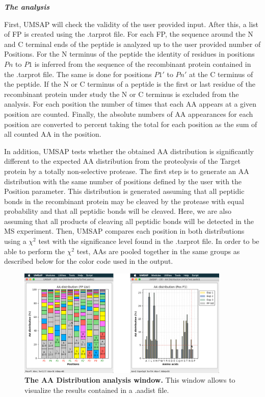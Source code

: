 \textit{\textbf{The analysis}}

First, UMSAP will check the validity of the user provided input. After this, a list of FP is created using the .tarprot file. For each FP, the sequence around the N and C terminal ends of the peptide is analyzed up to the user provided number of Positions. For the N terminus of the peptide the identity of residues in positions \(Pn\) to \(P1\) is inferred from the sequence of the recombinant protein contained in the .tarprot file. The same is done for positions \(P1'\) to \(Pn'\) at the C terminus of the peptide. If the N or C terminus of a peptide is the first or last residue of the recombinant protein under study the N or C terminus is excluded from the analysis. For each position the number of times that each AA appears at a given position are counted. Finally, the absolute numbers of AA appearances for each position are converted to percent taking the total for each position as the sum of all counted AA in the position.

In addition, UMSAP tests whether the obtained AA distribution is significantly different to the expected AA distribution from the proteolysis of the Target protein by a totally non-selective protease. The first step is to generate an AA distribution with the same number of positions defined by the user with the Position parameter. This distribution is generated assuming that all peptidic bonds in the recombinant protein may be cleaved by the protease with equal probability and that all peptidic bonds will be cleaved. Here, we are also assuming that all products of cleaving all peptidic bonds will be detected in the MS experiment. Then, UMSAP compares each position in both distributions using a $\chi^2$ test with the significance level found in the .tarprot file. In order to be able to perform the $\chi^2$ test, AAs are pooled together in the same groups as described below for the color code used in the output.    

\begin{figure}[h]
	\centering
	\includegraphics[width=0.9\textwidth]{./IMAGES/UTIL-AA-WINDOW/util-aa-res.jpg}	    
	\caption[The AA Distribution analysis window]{\textbf{The AA Distribution analysis window.} This window allows to visualize the results contained in a .aadist file.}
	\label{fig:utilAadistShow}
	\vspace{-5pt} 	
\end{figure}

